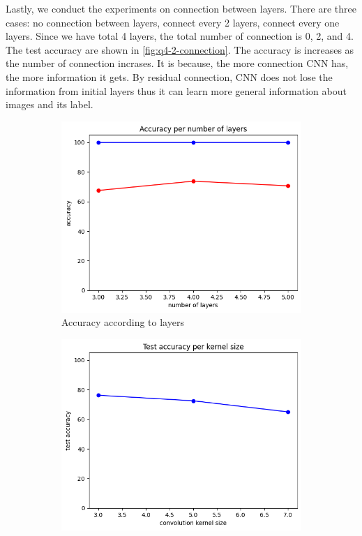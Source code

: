 Lastly, we conduct the experiments on connection between layers. There are three cases: no connection between layers, connect every 2 layers, connect every one layers. Since we have total 4 layers, the total number of connection is 0, 2, and 4. The test accuracy are shown in \cref{fig:q4-2-connection}. The accuracy is increases as the number of connection incrases. It is because, the more connection CNN has, the more information it gets. By residual connection, CNN does not lose the information from initial layers thus it can learn more general information about images and its label.

\begin{figure}[htbp]
	\centering
	\begin{subfigure}[t]{0.3\linewidth}
		\centering
		\includegraphics[width=\linewidth]{image/q4-2-layers.png}
		\caption{Accuracy according to layers}
		\label{fig:q4-2-layers}
	\end{subfigure}	
    \hfill
	\begin{subfigure}[t]{0.3\linewidth}
		\centering
		\includegraphics[width=\linewidth]{image/q4-2-kernel.png}

\end{subfigure}
\end{figure}
